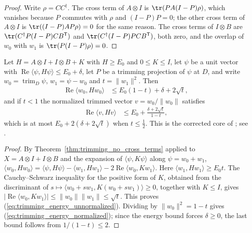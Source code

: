 \begin{proof}
    \leanok
    Write $\rho=CC^\dagger$. The cross term of $A\otimes I$ is
    $\tr(PA(I-P)\rho)$, which vanishes because $P$ commutes with $\rho$ and
    $(I-P)P=0$; the other cross term of $A\otimes I$ is $\tr((I-P)AP\rho)=0$
    for the same reason. The cross terms of $I\otimes B$ are
    $\tr(C^\dagger P(I-P)CB^{\mathsf T})$ and
    $\tr(C^\dagger(I-P)PCB^{\mathsf T})$, both zero, and the overlap of
    $w_0$ with $w_1$ is $\tr(P(I-P)\rho)=0$.
\end{proof}

\begin{theorem}
    \label{thm:trimming_energy}
    \leanok
    Let $H=A\otimes I+I\otimes B+K$ with $H\ge E_0$ and $0\le K\le I$, let
    $\psi$ be a unit vector with $\operatorname{Re}\langle\psi,H\psi\rangle
        \le E_0+\delta$, let $P$ be a trimming projection of $\psi$ at $D$, and
    write $w_0=\operatorname{trim}_D\psi$, $w_1=\psi-w_0$ and
    $t=\|w_1\|^2$. Then
    \begin{align}
        \operatorname{Re}\langle w_0,Hw_0\rangle & \le E_0(1-t)+\delta+2\sqrt t,
        \label{eq:trimming_energy_unnormalized}
    \end{align}
    and if $t<1$ the normalized trimmed vector $v=w_0/\|w_0\|$ satisfies
    \begin{align}
        \operatorname{Re}\langle v,Hv\rangle & \le
        E_0+\frac{\delta+2\sqrt t}{1-t},
        \label{eq:trimming_energy_normalized}
    \end{align}
    which is at most $E_0+2(\delta+2\sqrt t)$ when $t\le\frac12$. This is the
    corrected core of \cite[Lemma~l:2]{Landau2013PolynomialTime}; see
    \cite{gap:lvv13_trimming_energy}.
\end{theorem}

\begin{proof}
    \leanok
    By Theorem~\ref{thm:trimming_no_cross_terms} applied to
    $X=A\otimes I+I\otimes B$ and the expansion of $\langle\psi,K\psi\rangle$
    along $\psi=w_0+w_1$,
    $\langle w_0,Hw_0\rangle=\langle\psi,H\psi\rangle-\langle w_1,Hw_1\rangle
        -2\operatorname{Re}\langle w_0,Kw_1\rangle$. Here
    $\langle w_1,Hw_1\rangle\ge E_0t$. The Cauchy--Schwarz inequality for the
    positive form of $K$, obtained from the discriminant of
    $s\mapsto\langle w_0+sw_1,K(w_0+sw_1)\rangle\ge0$, together with $K\le I$,
    gives $|\operatorname{Re}\langle w_0,Kw_1\rangle|\le\|w_0\|\|w_1\|\le\sqrt t$.
    This proves (\ref{eq:trimming_energy_unnormalized}). Dividing by
    $\|w_0\|^2=1-t$ gives (\ref{eq:trimming_energy_normalized}); since the
    energy bound forces $\delta\ge0$, the last bound follows from
    $1/(1-t)\le2$.
\end{proof}

